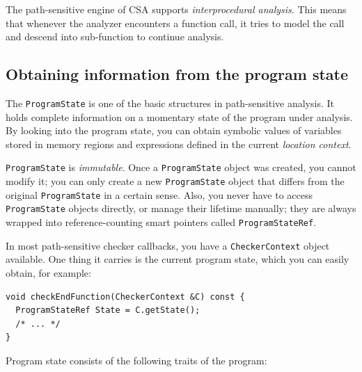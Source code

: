 \documentclass[a4paper,12pt]{article}
\newenvironment{nobr}{\begin{minipage}{\textwidth}\setlength\parskip{1em}
}{\end{minipage}\ignorespacesafterend}
\begin{document}
The path-sensitive engine of CSA supports \emph{interprocedural analysis}. This means that whenever the analyzer encounters a function call, it tries to model the call and descend into sub-function to continue analysis.

\subsection{Obtaining information from the program state}\label{subsec:program_state}

The \lstinline|ProgramState| is one of the basic structures in path-sensitive analysis. It holds complete information on a momentary state of the program under analysis. By looking into the program state, you can obtain symbolic values of variables stored in memory regions and expressions defined in the current \emph{location context}.

\lstinline|ProgramState| is \emph{immutable}. Once a \lstinline|ProgramState| object was created, you cannot modify it; you can only create a new \lstinline|ProgramState| object that differs from the original \lstinline|ProgramState| in a certain sense. Also, you never have to access \lstinline|ProgramState| objects directly, or manage their lifetime manually; they are always wrapped into reference-counting smart pointers called \lstinline|ProgramStateRef|.

\begin{nobr}
In most path-sensitive checker callbacks, you have a \lstinline|CheckerContext| object available. One thing it carries is the current program state, which you can easily obtain, for example:

\begin{lstlisting}[style=cplusplus,numbers=none]
void checkEndFunction(CheckerContext &C) const {
  ProgramStateRef State = C.getState();
  /* ... */
}
\end{lstlisting}
\end{nobr}

Program state consists of the following traits of the program:
\end{document}
